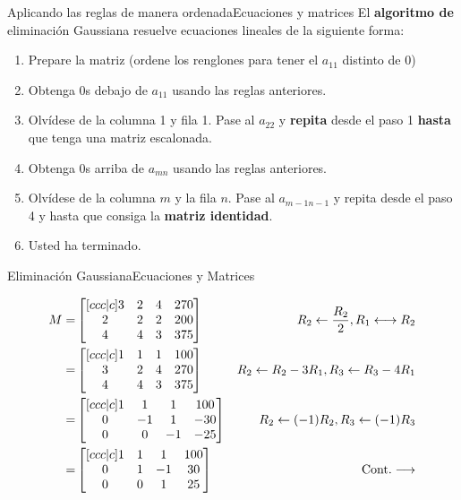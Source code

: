 \documentclass[spanish, c]{beamer}
\begin{document}
\begin{frame}{Aplicando las reglas de manera ordenada}{Ecuaciones y matrices}
    El \textbf{algoritmo de} \alert{eliminación Gaussiana} resuelve ecuaciones lineales de la siguiente forma:

    \begin{enumerate}
        \item Prepare la matriz (ordene los renglones para tener el $a_{11}$ distinto de 0)
        \item Obtenga 0s debajo de $a_{11}$ usando las reglas anteriores.
        \item Olvídese de la columna 1 y fila 1. Pase al $a_{22}$ y \textbf{repita} desde el paso 1 \textbf{hasta} que tenga una \alert{matriz escalonada}.
        \item Obtenga 0s arriba de $a_{mn}$ usando las reglas anteriores.
        \item Olvídese de la columna $m$ y la fila $n$. Pase al $a_{m-1n-1}$ y repita desde el paso 4 y hasta que consiga la \textbf{matriz identidad}.
        \item Usted ha terminado.
    \end{enumerate}

\end{frame}

\begin{frame}{Eliminación Gaussiana}{Ecuaciones y Matrices}

    \begin{align*}
        M =
    & \begin{bmatrix}[ccc|c]
        3 & 2 & 4 & 270 \\
        2 & 2 & 2 & 200 \\
        4 & 4 & 3 & 375
    \end{bmatrix}
    & \hfill R_2 \gets \frac{R_2}{2}, R_1 \longleftrightarrow R_2 \\
    = & \begin{bmatrix}[ccc|c]
        1 & 1 & 1 & 100 \\
        3 & 2 & 4 & 270 \\
        4 & 4 & 3 & 375
    \end{bmatrix}
    & R_2 \gets R_2 - 3R_1, R_3 \gets R_3 - 4R_1 \\
    = & \begin{bmatrix}[ccc|c]
        1 & 1 & 1 & 100 \\
        0 & -1 & 1 & -30 \\
        0 & 0 & -1 & -25
    \end{bmatrix}
    & R_2 \gets (-1)R_2, R_3 \gets (-1)R_3 \\
    = & \begin{bmatrix}[ccc|c]
        1 & 1 & 1 & 100 \\
        0 & 1 & -1 & 30 \\
        0 & 0 & 1 & 25
    \end{bmatrix}
    & \text{Cont.} \longrightarrow
    \end{align*}
\end{frame}
\end{document}
